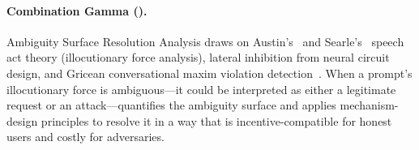 \paragraph{Combination Gamma (\asra).} Ambiguity Surface Resolution Analysis draws on Austin's~\cite{austin1962} and Searle's~\cite{searle1969} speech act theory (illocutionary force analysis), lateral inhibition from neural circuit design, and Gricean conversational maxim violation detection~\cite{grice1975}. When a prompt's illocutionary force is ambiguous---it could be interpreted as either a legitimate request or an attack---\asra quantifies the ambiguity surface and applies mechanism-design principles to resolve it in a way that is incentive-compatible for honest users and costly for adversaries.
